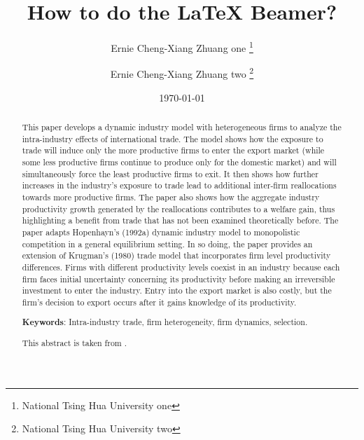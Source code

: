 \documentclass[utf8,12pt]{article} %
\title{How to do the \LaTeX{}  Beamer?}
\author{%
Ernie Cheng-Xiang Zhuang one \thanks{National Tsing Hua University one} \and%
Ernie Cheng-Xiang Zhuang two \thanks{National Tsing Hua University two}
}
\date{\today}
\begin{document}

%
\maketitle 
%
%
\begin{abstract}\fontsize{12}{20pt}
\begin{spacing}{1.5}
This paper develops a dynamic industry model with heterogeneous firms to analyze the intra-industry effects of international trade.
The model shows how the exposure to trade will induce only the more productive firms to enter the export market
(while some less productive firms continue to produce only for the domestic market)
and will simultaneously force the least productive firms to exit.
It then shows how further increases in the industry's exposure to trade lead to additional inter-firm reallocations towards more productive firms.
The paper also shows how the aggregate industry productivity growth generated by the reallocations contributes to a welfare gain,
thus highlighting a benefit from trade that has not been examined theoretically before.
The paper adapts Hopenhayn's (1992a) dynamic industry model to monopolistic competition in a general equilibrium setting.
In so doing, the paper provides an extension of Krugman's (1980) trade model that incorporates firm level productivity differences.
Firms with different productivity levels coexist in an industry because each firm faces initial uncertainty concerning its productivity before making an irreversible investment to enter the industry.
Entry into the export market is also costly, but the firm's decision to export occurs after it gains knowledge of its productivity.

\bigskip
\noindent
\textbf{Keywords}: Intra-industry trade, firm heterogeneity, firm dynamics, selection.

\bigskip
\noindent
This abstract is taken from \href{https://www.jstor.org/stable/1555536}{\citet{melitz2003}}.
\end{spacing}
\end{abstract}
%
%
\newpage
\begin{spacing}{1.5}
\tableofcontents
%
\newpage
\listoffigures
%
\newpage
\listoftables
%
\end{spacing}
%
%
\newpage
{} %
\end{document}
